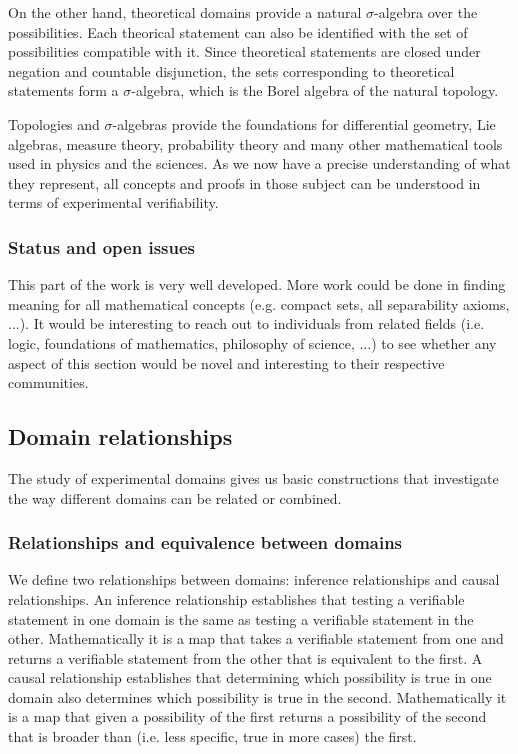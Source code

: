 \documentclass[twocolumn]{article}
\begin{document}
On the other hand, theoretical domains provide a natural $\sigma$-algebra over the possibilities. Each theorical statement can also be identified with the set of possibilities compatible with it. Since theoretical statements are closed under negation and countable disjunction, the sets corresponding to theoretical statements form a $\sigma$-algebra, which is the Borel algebra of the natural topology.

Topologies and $\sigma$-algebras provide the foundations for differential geometry, Lie algebras, measure theory, probability theory and many other mathematical tools used in physics and the sciences. As we now have a precise understanding of what they represent, all concepts and proofs in those subject can be understood in terms of experimental verifiability.

\subsubsection{Status and open issues}

This part of the work is very well developed. More work could be done in finding meaning for all mathematical concepts (e.g. compact sets, all separability axioms, ...). It would be interesting to reach out to individuals from related fields (i.e. logic, foundations of mathematics, philosophy of science, ...) to see whether any aspect of this section would be novel and interesting to their respective communities.

\subsection{Domain relationships}

The study of experimental domains gives us basic constructions that investigate the way different domains can be related or combined.

\subsubsection{Relationships and equivalence between domains}

We define two relationships between domains: inference relationships and causal relationships. An inference relationship establishes that testing a verifiable statement in one domain is the same as testing a verifiable statement in the other. Mathematically it is a map that takes a verifiable statement from one and returns a verifiable statement from the other that is equivalent to the first. A causal relationship establishes that determining which possibility is true in one domain also determines which possibility is true in the second. Mathematically it is a map that given a possibility of the first returns a possibility of the second that is broader than (i.e. less specific, true in more cases) the first.
\end{document}

